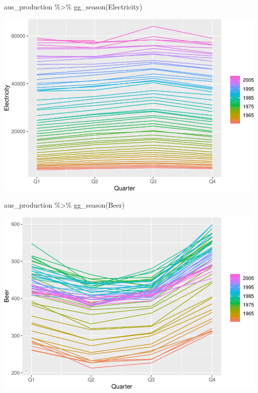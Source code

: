 \documentclass[
]{book}
\newenvironment{Shaded}{\begin{snugshade}}{\end{snugshade}}
\newcommand{\FunctionTok}[1]{\textcolor[rgb]{0.00,0.00,0.00}{#1}}
\newcommand{\NormalTok}[1]{#1}
\newcommand{\SpecialCharTok}[1]{\textcolor[rgb]{0.00,0.00,0.00}{#1}}
\begin{document}
\begin{Shaded}
\begin{Highlighting}[]
\NormalTok{aus\_production }\SpecialCharTok{\%\textgreater{}\%} \FunctionTok{gg\_season}\NormalTok{(Electricity)}
\end{Highlighting}
\end{Shaded}

\includegraphics{graphics/unnamed-chunk-16-1.pdf}

\begin{Shaded}
\begin{Highlighting}[]
\NormalTok{aus\_production }\SpecialCharTok{\%\textgreater{}\%} \FunctionTok{gg\_season}\NormalTok{(Beer)}
\end{Highlighting}
\end{Shaded}

\includegraphics{graphics/unnamed-chunk-16-2.pdf}
\end{document}
